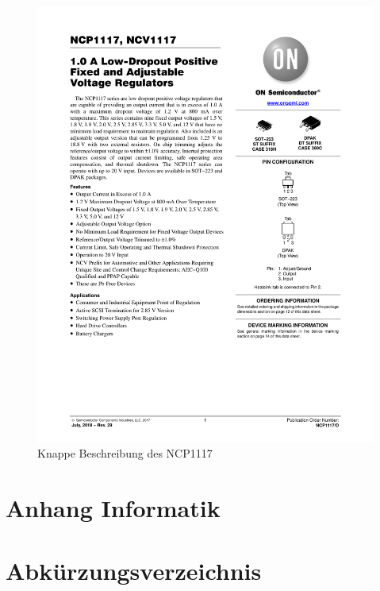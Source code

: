 \begin{figure}[hb]
    \centering
    \includegraphics[scale=0.85,page=1]{fig/elektro/NCP1117-D.PDF}
    \caption{Knappe Beschreibung des NCP1117}
\end{figure}

\chapter{Anhang Informatik}

\markboth{}{}    %

\printbibliography
\nocite{*}


\chapter{Abkürzungsverzeichnis}

